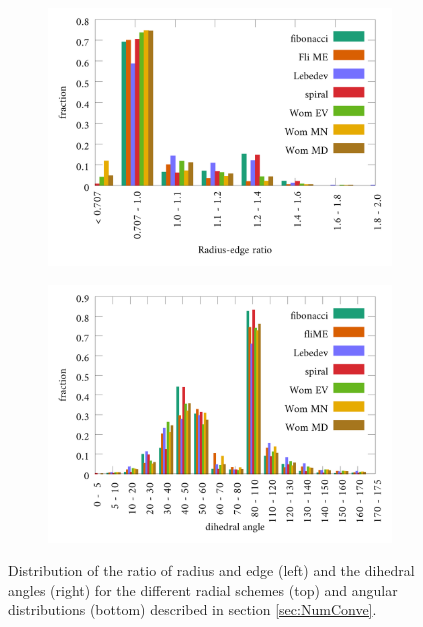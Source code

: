 \begin{figure}
\begin{subfigure}{0.5\textwidth}
\end{subfigure}
\begin{subfigure}{0.5\textwidth}
\includegraphics[width=\textwidth]{Figures/App/Sph_histAp1.pdf}
\end{subfigure}
\begin{subfigure}{0.5\textwidth}
\includegraphics[width=\textwidth]{Figures/App/Sph_histAp2.pdf}
\end{subfigure}
\caption{Distribution of the ratio of radius and edge (left) and the dihedral angles (right)
for the different radial schemes (top) and angular distributions (bottom) described in section \ref{sec:NumConve}.}
\label{appFig:SchemHist}
\end{figure}

